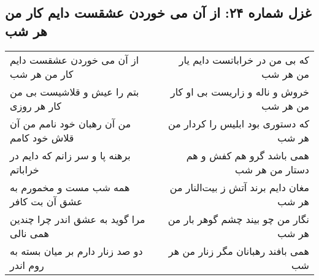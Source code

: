 \begin{center}
\section*{غزل شماره ۲۴: از آن می خوردن عشقست دایم کار من هر شب}
\label{sec:024}
\begin{longtable}{l p{0.5cm} r}
از آن می خوردن عشقست دایم کار من هر شب
&&
که بی من در خراباتست دایم یار من هر شب
\\
بتم را عیش و قلاشیست بی من کار هر روزی
&&
خروش و ناله و زاریست بی او کار من هر شب
\\
من آن رهبان خود نامم من آن قلاش خود کامم
&&
که دستوری بود ابلیس را کردار من هر شب
\\
برهنه پا و سر زانم که دایم در خراباتم
&&
همی باشد گرو هم کفش و هم دستار من هر شب
\\
همه شب مست و مخمورم به عشق آن بت کافر
&&
مغان دایم برند آتش ز بیت‌النار من هر شب
\\
مرا گوید به عشق اندر چرا چندین همی نالی
&&
نگار من چو بیند چشم گوهر بار من هر شب
\\
دو صد زنار دارم بر میان بسته به روم اندر
&&
همی بافند رهبانان مگر زنار من هر شب
\\
\end{longtable}
\end{center}
